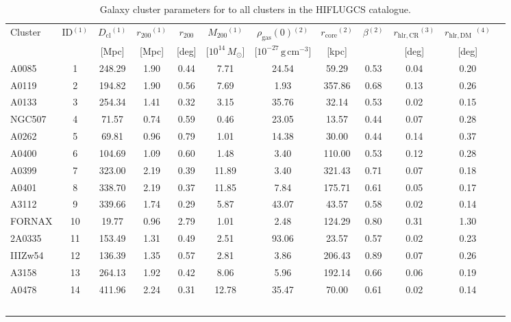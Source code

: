 \documentclass[10pt,aps,pra,reprint,amsmath,amsfonts,amssymb,showpacs,nofootinbib,floatfix]{revtex4-1}
\newcommand{\rmn}{\mathrm}
\newcommand{\clu}{\rmn{cl}}
\newcommand{\msun}{M_\odot}
\newcommand{\rvir}{r_{200}}
\newcommand{\mvir}{M_{200}}
\begin{document}
\begin{table}
\begin{minipage}{2.0\columnwidth}
  \caption{Galaxy cluster parameters for to all clusters in the HIFLUGCS catalogue.}
\begin{tabular}{l  c c c c c c c c c c c}
\hline
\hline
Cluster & ID$^{(1)}$ & $D_\clu$$^{(1)}$ & $\rvir$$^{(1)}$ & $\rvir$ & 
$\mvir$$^{(1)}$ & $\rho_\rmn{gas}(0)$$^{(2)}$ & $r_\rmn{core}$$^{(2)}$ & 
$\beta$$^{(2)}$ & $r_\rmn{hlr,CR}$$^{(3)}$ & $r_\rmn{hlr,DM}$  $^{(4)}$ \\
& & [Mpc] & [Mpc] & [deg] & [$10^{14}\,\msun$] & 
[$10^{-27}\,\rmn{g}\,\rmn{cm}^{-3}$] & [kpc] &  & [deg] & [deg] \\
 \hline
A0085    &   1 & 248.29 &   1.90 &   0.44 &   7.71 &  24.54 &  59.29 &   0.53 &   0.04 &   0.20 \\
A0119    &   2 & 194.82 &   1.90 &   0.56 &   7.69 &   1.93 & 357.86 &   0.68 &   0.13 &   0.26 \\
A0133    &   3 & 254.34 &   1.41 &   0.32 &   3.15 &  35.76 &  32.14 &   0.53 &   0.02 &   0.15 \\
NGC507   &   4 &  71.57 &   0.74 &   0.59 &   0.46 &  23.05 &  13.57 &   0.44 &   0.07 &   0.28 \\
A0262    &   5 &  69.81 &   0.96 &   0.79 &   1.01 &  14.38 &  30.00 &   0.44 &   0.14 &   0.37 \\
A0400    &   6 & 104.69 &   1.09 &   0.60 &   1.48 &   3.40 & 110.00 &   0.53 &   0.12 &   0.28 \\
A0399    &   7 & 323.00 &   2.19 &   0.39 &  11.89 &   3.40 & 321.43 &   0.71 &   0.07 &   0.18 \\
A0401    &   8 & 338.70 &   2.19 &   0.37 &  11.85 &   7.84 & 175.71 &   0.61 &   0.05 &   0.17 \\
A3112    &   9 & 339.66 &   1.74 &   0.29 &   5.87 &  43.07 &  43.57 &   0.58 &   0.02 &   0.14 \\
FORNAX   &  10 &  19.77 &   0.96 &   2.79 &   1.01 &   2.48 & 124.29 &   0.80 &   0.31 &   1.30 \\
2A0335   &  11 & 153.49 &   1.31 &   0.49 &   2.51 &  93.06 &  23.57 &   0.57 &   0.02 &   0.23 \\
IIIZw54  &  12 & 136.39 &   1.35 &   0.57 &   2.81 &   3.86 & 206.43 &   0.89 &   0.07 &   0.26 \\
A3158    &  13 & 264.13 &   1.92 &   0.42 &   8.06 &   5.96 & 192.14 &   0.66 &   0.06 &   0.19 \\
A0478    &  14 & 411.96 &   2.24 &   0.31 &  12.78 &  35.47 &  70.00 &   0.61 &   0.02 &   0.14 \\
$$
\end{tabular}
\end{minipage}
\end{table}
\end{document}
